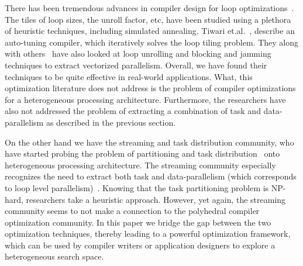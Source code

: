 \documentclass[10pt, conference, compsocconf]{IEEEtran}
\begin{document}
There has been tremendous advances in compiler design for loop
optimizations~\cite{ubon08,atiw09,tkis00}. The tiles of loop sizes, the
unroll factor, etc, have been studied using a plethora of heuristic
techniques, including simulated annealing. Tiwari et.al.~\cite{atiw09},
describe an auto-tuning compiler, which iteratively solves the loop
tiling problem. They along with others~\cite{tkis00} have also looked at
loop unrolling and blocking and jamming techniques to extract vectorized
parallelism. Overall, we have found their techniques to be quite
effective in real-world applications. What, this optimization literature
does not address is the problem of compiler optimizations for a
heterogeneous processing architecture. Furthermore, the researchers have
also not addressed the problem of extracting a combination of task and
data-parallelism as described in the previous section. 

On the other hand we have the streaming and task distribution community,
who have started probing the problem of partitioning and task
distribution~\cite{ssan05,adou04,pcar09} onto heterogeneous processing
architecture. The streaming community especially recognizes the need to
extract both task and data-parallelism (which corresponds to loop level
parallelism)~\cite{mgor06}. Knowing that the task partitioning problem
is NP-hard, researchers take a heuristic approach. However,
yet again, the streaming community seems to not make a connection
to the polyhedral compiler optimization community. In
this paper we bridge the gap between the two optimization techniques,
thereby leading to a powerful optimization framework, which can be used
by compiler writers or application designers to explore a heterogeneous
search space.

\end{document}
